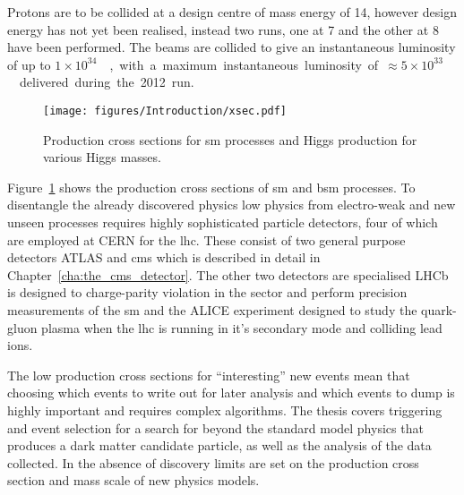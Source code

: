 Protons are to be collided at a design centre of mass energy of \unit{14}{\TeV}, however design energy has not yet been realised, instead two runs, one at \unit{7}{\TeV} and the other at \unit{8}{\TeV} have been performed. The beams are collided to give an instantaneous luminosity of up to \unit{$1\times10^{34}$}{\lumiunits}, with a maximum instantaneous luminosity of \unit{$\approx 5 \times 10^{33}$}{\lumiunits} delivered during the 2012 run.



\begin{figure}[ht]
  \centering
    \texttt{[image: figures/Introduction/xsec.pdf]}
  \caption{Production cross sections for \ac{sm} processes and Higgs production for various Higgs masses.}
  \label{fig:figures_Introduction_xsec}
\end{figure}

Figure~\ref{fig:figures_Introduction_xsec} shows the production cross sections of \ac{sm} and \ac{bsm} processes. To disentangle the already discovered physics low \pt physics from electro-weak and new unseen processes requires highly sophisticated particle detectors, four of which are employed at CERN for the \ac{lhc}. These consist of two general purpose detectors ATLAS\cite{ref:atlas} and \ac{cms}\cite{ref:cms} which is described in detail in Chapter~\ref{cha:the_cms_detector}. The other two detectors are specialised LHCb\cite{ref:lhcb} is designed to charge-parity violation in the \Pbottom sector and perform precision measurements of the \ac{sm} and the ALICE\cite{ref:alice} experiment designed to study the quark-gluon plasma when the \ac{lhc} is running in it's secondary mode and colliding lead ions.


The low production cross sections for ``interesting'' new events mean that choosing which events to write out for later analysis and which events to dump is highly important and requires complex algorithms. The thesis covers triggering and event selection for a search for beyond the standard model physics that produces a dark matter candidate particle, as well as the analysis of the data collected. In the absence of discovery limits are set on the production cross section and mass scale of new physics models.

















